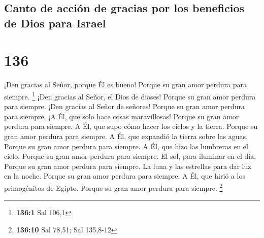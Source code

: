 \hypertarget{canto-de-acciuxf3n-de-gracias-por-los-beneficios-de-dios-para-israel}{%
\subsection{Canto de acción de gracias por los beneficios de Dios para
Israel}\label{canto-de-acciuxf3n-de-gracias-por-los-beneficios-de-dios-para-israel}}

\hypertarget{section-135}{%
\section{136}\label{section-135}}

 ¡Den gracias al Señor, porque Él es bueno! Porque su gran
amor perdura para siempre. \footnote{\textbf{136:1} Sal 106,1}
 ¡Den gracias al Señor, el Dios de dioses! Porque su gran
amor perdura para siempre.  ¡Den gracias al Señor de
señores! Porque su gran amor perdura para siempre.  ¡A Él,
que solo hace cosas maravillosas! Porque su gran amor perdura para
siempre.  A Él, que supo cómo hacer los cielos y la
tierra. Porque su gran amor perdura para siempre.  A Él,
que expandió la tierra sobre las aguas. Porque su gran amor perdura para
siempre.  A Él, que hizo las lumbreras en el cielo. Porque
su gran amor perdura para siempre.  El sol, para iluminar
en el día. Porque su gran amor perdura para siempre.  La
luna y las estrellas para dar luz en la noche. Porque su gran amor
perdura para siempre.  A Él, que hirió a los primogénitos
de Egipto. Porque su gran amor perdura para siempre. \footnote{\textbf{136:10}
  Sal 78,51; Sal 135,8-12}

